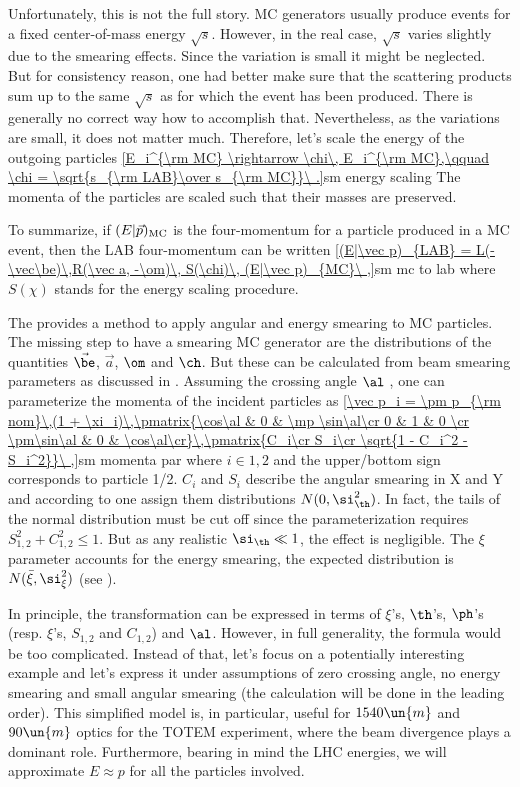 Unfortunately, this is not the full story. MC generators usually produce events for a fixed center-of-mass energy $\sqrt{s}$. However, in the real case, $\sqrt{s}$ varies slightly due to the smearing effects. Since the variation is small it might be neglected. But for consistency reason, one had better make sure that the scattering products sum up to the same $\sqrt{s}$ as for which the event has been produced. There is generally no correct way how to accomplish that. Nevertheless, as the variations are small, it does not matter much. Therefore, let's scale the energy of the outgoing particles
\eqref{E_i^{\rm MC} \rightarrow \chi\, E_i^{\rm MC},\qquad \chi = \sqrt{s_{\rm LAB}\over s_{\rm MC}}\ .}{sm energy scaling}
The momenta of the particles are scaled such that their masses are preserved.

To summarize, if $(E|\vec p)_{\rm MC}$ is the four-momentum for a particle produced in a MC event, then the LAB four-momentum can be written
\eqref{(E|\vec p)_{LAB} = L(-\vec\be)\,R(\vec a, -\om)\, S(\chi)\, (E|\vec p)_{MC}\ ,}{sm mc to lab}
where $S(\chi)$ stands for the energy scaling procedure.



The  provides a method to apply angular and energy smearing to MC particles. The missing step to have a smearing MC generator are the distributions of the quantities $\vec\be$, $\vec a$, $\om$ and $\ch$. But these can be calculated from beam smearing parameters as discussed in . Assuming the crossing angle $\al$ , one can parameterize the momenta of the incident particles as
\eqref{\vec p_i = \pm p_{\rm nom}\,(1 + \xi_i)\,\pmatrix{\cos\al & 0 & \mp \sin\al\cr 0 & 1 & 0 \cr \pm\sin\al & 0 & \cos\al\cr}\,\pmatrix{C_i\cr S_i\cr \sqrt{1 - C_i^2 - S_i^2}}\ ,}{sm momenta par}
where $i\in {1, 2}$ and the upper/bottom sign corresponds to particle 1/2. $C_i$ and $S_i$ describe the angular smearing in X and Y and according to  one assign them distributions $N(0, \si_\th^2)$. In fact, the tails of the normal distribution must be cut off since the parameterization requires $S_{1,2}^2 + C_{1,2}^2 \leq 1$. But as any realistic $\si_\th \ll 1$, the effect is negligible. The $\xi$ parameter accounts for the energy smearing, the expected distribution is $N(\bar\xi, \si_\xi^2)$ (see ).


In principle, the transformation  can be expressed in terms of $\xi$'s, $\th$'s, $\ph$'s (resp. $\xi$'s, $S_{1,2}$ and $C_{1,2}$) and $\al$. However, in full generality, the formula would be too complicated. Instead of that, let's focus on a potentially interesting example and let's express it under assumptions of zero crossing angle, no energy smearing and small angular smearing (the calculation will be done in the leading order). This simplified model is, in particular, useful for $1540\un{m}$ and $90\un{m}$ optics for the TOTEM experiment, where the beam divergence plays a dominant role. Furthermore, bearing in mind the LHC energies, we will approximate $E\approx p$ for all the particles involved.

